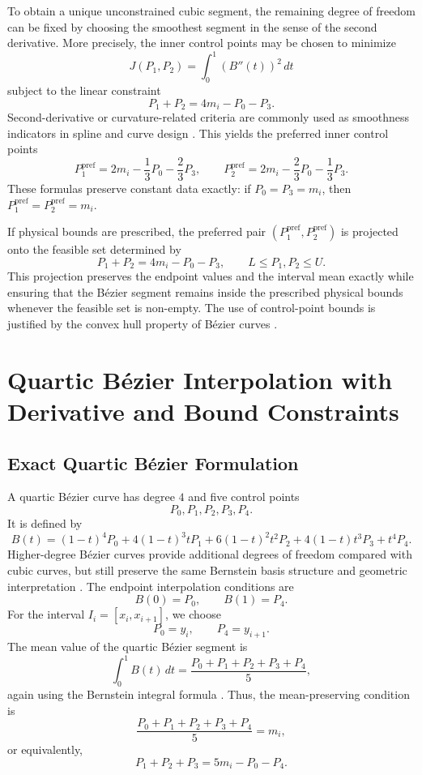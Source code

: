 \documentclass[12pt,a4paper]{article}
\begin{document}
To obtain a unique unconstrained cubic segment, the remaining degree of freedom can be fixed by choosing the smoothest segment in the sense of the second derivative. More precisely, the inner control points may be chosen to minimize
\[
J(P_1,P_2)=\int_0^1 \left(B''(t)\right)^2\,dt
\]
subject to the linear constraint
\[
P_1+P_2=4m_i-P_0-P_3.
\]
Second-derivative or curvature-related criteria are commonly used as smoothness indicators in spline and curve design \cite{deboor1978splines,farin2002curves}. This yields the preferred inner control points
\[
P_1^{\mathrm{pref}}=2m_i-\frac{1}{3}P_0-\frac{2}{3}P_3,
\qquad
P_2^{\mathrm{pref}}=2m_i-\frac{2}{3}P_0-\frac{1}{3}P_3.
\]
These formulas preserve constant data exactly: if \(P_0=P_3=m_i\), then \(P_1^{\mathrm{pref}}=P_2^{\mathrm{pref}}=m_i\).

If physical bounds are prescribed, the preferred pair \((P_1^{\mathrm{pref}},P_2^{\mathrm{pref}})\) is projected onto the feasible set determined by
\[
P_1+P_2=4m_i-P_0-P_3,
\qquad
L\leq P_1,P_2\leq U.
\]
This projection preserves the endpoint values and the interval mean exactly while ensuring that the B\'ezier segment remains inside the prescribed physical bounds whenever the feasible set is non-empty. The use of control-point bounds is justified by the convex hull property of B\'ezier curves \cite{farin2002curves,piegl1997nurbs,aaltoBezier2013}.

\newpage
\section{Quartic B\'ezier Interpolation with Derivative and Bound Constraints}

\subsection{Exact Quartic B\'ezier Formulation}

A quartic B\'ezier curve has degree \(4\) and five control points
\[
P_0,P_1,P_2,P_3,P_4.
\]
It is defined by
\[
B(t)=(1-t)^4P_0+4(1-t)^3tP_1+6(1-t)^2t^2P_2+4(1-t)t^3P_3+t^4P_4.
\]
Higher-degree B\'ezier curves provide additional degrees of freedom compared with cubic curves, but still preserve the same Bernstein basis structure and geometric interpretation \cite{farin2002curves,piegl1997nurbs}. The endpoint interpolation conditions are
\[
B(0)=P_0,
\qquad
B(1)=P_4.
\]
For the interval \(I_i=[x_i,x_{i+1}]\), we choose
\[
P_0=y_i,
\qquad
P_4=y_{i+1}.
\]
The mean value of the quartic B\'ezier segment is
\[
\int_0^1B(t)\,dt=
\frac{P_0+P_1+P_2+P_3+P_4}{5},
\]
again using the Bernstein integral formula \cite{farin2002curves,aaltoBezier2013}. Thus, the mean-preserving condition is
\[
\frac{P_0+P_1+P_2+P_3+P_4}{5}=m_i,
\]
or equivalently,
\[
P_1+P_2+P_3=5m_i-P_0-P_4.
\]
\end{document}
